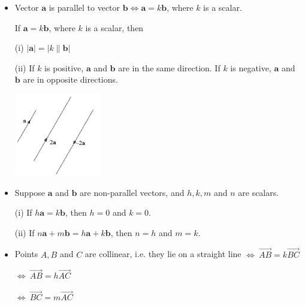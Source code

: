 \documentclass[twocolumn]{article}
\begin{document}
\begin{itemize}
\item  Vector $\mathbf{a}$ is parallel to vector $\mathbf{b} \Leftrightarrow \mathbf{a}=k \mathbf{b}$, where $k$ is a scalar.

If $\mathbf{a}=k \mathbf{b}$, where $k$ is a scalar, then

(i) $|\mathbf{a}|=|k \| \mathbf{b}|$

(ii) If $k$ is positive, $\mathbf{a}$ and $\mathbf{b}$ are in the same direction. If $k$ is negative, $\mathbf{a}$ and $\mathbf{b}$ are in opposite directions.

\includegraphics[width=0.3\textwidth]{206.png}

\item Suppose $\mathbf{a}$ and $\mathbf{b}$ are non-parallel vectors, and $h, k, m$ and $n$ are scalars.

(i) If $h \mathbf{a}=k \mathbf{b}$, then $h=0$ and $k=0$.

(ii) If $n \mathbf{a}+m \mathbf{b}=h \mathbf{a}+k \mathbf{b}$, then $n=h$ and $m=k$.

\item Points $A, B$ and $C$ are collinear, i.e. they lie on a straight line $\Leftrightarrow \ \overrightarrow{A B}=k \overrightarrow{B C}$

$\Leftrightarrow \ \overrightarrow{A B}=h \overrightarrow{A C}$ 

$\Leftrightarrow \ \overrightarrow{B C}=m \overrightarrow{A C}$


\end{itemize}
\end{document}
